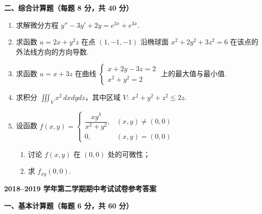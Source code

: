 \documentclass[a4paper,11pt]{ctexart}
\begin{document}
\textbf{二、综合计算题（每题 8 分，共 40 分）}

\begin{enumerate}[label=\arabic*., start=11, leftmargin=2em, itemsep=0.9em, topsep=0.6em]
  \item 求解微分方程 $y'' - 3y' + 2y = e^{2x} + e^{3x}$.

  \item 求函数 $u = 2x + y^2z$ 在点 $(1,-1,-1)$ 沿椭球面 $x^2 + 2y^2 + 3z^2 = 6$ 在该点的外法线方向的方向导数.

  \item 求函数 $u = x + 3z$ 在曲线 $\begin{cases} x + 2y - 3z = 2 \\ x^2 + y^2 = 2 \end{cases}$ 上的最大值与最小值.

  \item 求积分 $\displaystyle\iiint_V x^2\,dxdydz$，其中区域 $V:\ x^2 + y^2 + z^2 \le 2z$.

  \item 设函数 $f(x,y) = \begin{cases} \dfrac{xy^3}{x^2+y^2}, & (x,y) \neq (0,0) \\ 0, & (x,y) = (0,0) \end{cases}$
  \begin{enumerate}[label=(\arabic*), leftmargin=2em, itemsep=0.3em, topsep=0.3em]
    \item 讨论 $f(x,y)$ 在 $(0,0)$ 处的可微性；
    \item 求 $f_{xy}(0,0)$.
  \end{enumerate}
\end{enumerate}

\newpage

\begin{center}
  {\Large\bfseries 2018--2019 学年第二学期期中考试试卷参考答案}
\end{center}

\vspace{0.6em}

\textbf{一、基本计算题（每题 6 分，共 60 分）}
\end{document}
